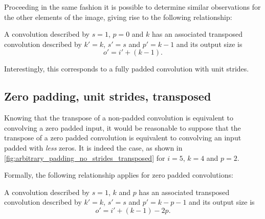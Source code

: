 Proceeding in the same fashion it is possible to determine similar observations
for the other elements of the image, giving rise to the following relationship:

\begin{relationship}\label{rel:no_padding_no_strides_transposed}
A convolution described by $s = 1$, $p = 0$ and $k$ has an associated
transposed convolution described by $k' = k$, $s' = s$ and $p' = k - 1$ and its
output size is
\begin{equation*}
    o' = i' + (k - 1).
\end{equation*}
\end{relationship}

Interestingly, this corresponds to a fully padded convolution with unit
strides.

\subsection{Zero padding, unit strides, transposed}

Knowing that the transpose of a non-padded convolution is equivalent to
convolving a zero padded input, it would be reasonable to suppose that the
transpose of a zero padded convolution is equivalent to convolving an input
padded with {\em less\/} zeros. It is indeed the case, as shown in
\autoref{fig:arbitrary_padding_no_strides_transposed} for $i = 5$, $k = 4$ and
$p = 2$.

Formally, the following relationship applies for zero padded convolutions:

\begin{relationship}\label{rel:arbitrary_padding_no_strides_transposed}
A convolution described by $s = 1$, $k$ and $p$ has an
associated transposed convolution described by $k' = k$, $s' = s$ and $p' = k -
p - 1$ and its output size is
\begin{equation*}
    o' = i' + (k - 1) - 2p.
\end{equation*}
\end{relationship}

